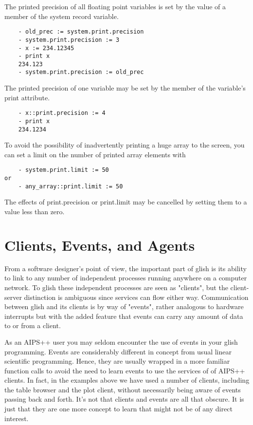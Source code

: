     The printed precision of all floating point variables is set by the
value of a member of the system record variable.

\begin{verbatim}
	- old_prec := system.print.precision
	- system.print.precision := 3
	- x := 234.12345
	- print x
	234.123
	- system.print.precision := old_prec
\end{verbatim}

    The printed precision of one variable may be set by the member of the
variable's print attribute.

\begin{verbatim}
	- x::print.precision := 4
	- print x
	234.1234
\end{verbatim}

    To avoid the possibility of inadvertently printing a huge array to the
screen, you can set a limit on the number of printed array elements with

\begin{verbatim}
	- system.print.limit := 50
or
	- any_array::print.limit := 50
\end{verbatim}

The effects of print.precision or print.limit may be cancelled by setting
them to a value less than zero.


\section{Clients, Events, and Agents}

    From a software designer's point of view, the important part of glish is
its ability to link to any number of independent processes running anywhere
on a computer network.  To glish these independent processes are seen as
"clients", but the client-server distinction is ambiguous since services can
flow either way.  Communication between glish and its clients is by way of
"events", rather analogous to hardware interrupts but with the added feature
that events can carry any amount of data to or from a client.

    As an AIPS++ user you may seldom encounter the use of events in your
glish programming.  Events are considerably different in concept from usual
linear scientific programming.  Hence, they are usually wrapped in a more
familiar function calls to avoid the need to learn events to use the
services of of AIPS++ clients.  In fact, in the examples above we have used
a number of clients, including the table browser and the plot client,
without necessarily being aware of events passing back and forth.  It's not
that clients and events are all that obscure.  It is just that they are one
more concept to learn that might not be of any direct interest.

